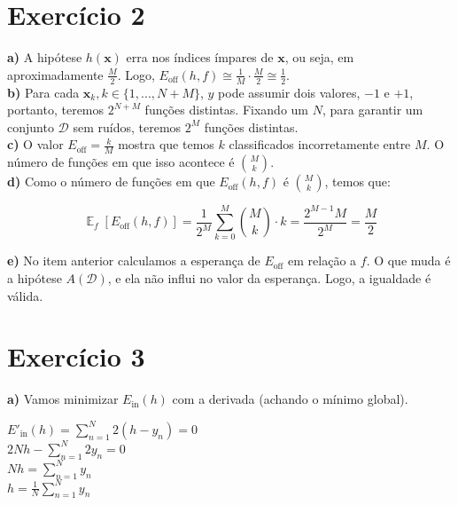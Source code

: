 \documentclass[12pt,letterpaper]{article}
\DeclareMathOperator{\expv}{\mathbb{E}}
\begin{document}
	\section*{Exercício 2}
	
	\textbf{a)} A hipótese $ h(\mathbf{x}) $ erra nos índices ímpares de $\mathbf{x}$, ou seja, em aproximadamente $ \frac{M}{2} $. Logo, $ E_{\text{off}}(h,f) \cong \frac{1}{M}\cdot\frac{M}{2} \cong \frac{1}{2}$. \\
	
	\textbf{b)} Para cada $ \mathbf{x}_k, k \in \{1,..., N+M\}$, $ y $ pode assumir dois valores, $ -1 $ e $ +1 $, portanto, teremos $ 2^{N+M} $ funções distintas. Fixando um $N$, para garantir um conjunto $ \mathcal{D} $ sem ruídos, teremos $ 2^M $ funções distintas. \\
	
	\textbf{c)} O valor $ E_{\text{off}} = \frac{k}{M} $ mostra que temos $ k $ classificados incorretamente entre $ M $. O número de funções em que isso acontece é $ \binom{M}{k} $. \\
	
	\textbf{d)} Como o número de funções em que $ E_{\text{off}}(h,f) $ é $ \binom{M}{k} $, temos que: 
	
	\begin{equation*}
			\expv_f[E_{\text{off}}(h,f)] = \frac{1}{2^M} \sum_{k=0}^{M}\binom{M}{k} \cdot k = \frac{2^{M-1}M}{2^M} = \frac{M}{2}
	\end{equation*}
	
	\textbf{e)} No item anterior calculamos a esperança de $E_{\text{off}}$ em relação a $f$. O  que muda é a hipótese $ A(\mathcal{D}) $, e ela não influi no valor da esperança. Logo, a igualdade é válida.
	
	\section*{Exercício 3}
	
	\textbf{a)} Vamos minimizar $ E_{\text{in}}(h) $ com a derivada (achando o mínimo global).
	
	\begin{center} 
		$E'_{\text{in}}(h) = \sum_{n=1}^{N} 2(h-y_n) = 0$ \\
		$2Nh - \sum_{n=1}^{N} 2y_n = 0$ \\
		$Nh = \sum_{n=1}^{N} y_n$ \\
		$h = \frac{1}{N} \sum_{n=1}^{N} y_n$
	\end{center}
	
\end{document}
